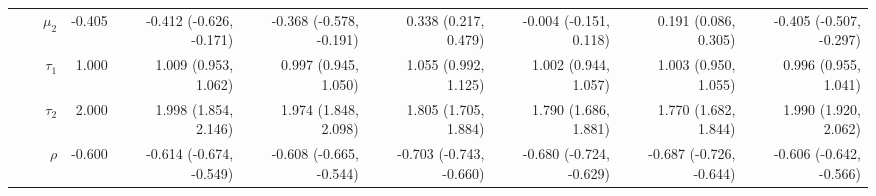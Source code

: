 \documentclass[
]{article}
\begin{document}
\begin{table}
\begin{tabular}[t]{rrrrrrrrrr}
 &  & $\mu_2$ & -0.405 & -0.412 (-0.626, -0.171) & -0.368 (-0.578, -0.191) & 0.338 (0.217, 0.479) & -0.004 (-0.151, 0.118) & 0.191 (0.086, 0.305) & -0.405 (-0.507, -0.297)\\
 &  & $\tau_1$ & 1.000 & 1.009 (0.953, 1.062) & 0.997 (0.945, 1.050) & 1.055 (0.992, 1.125) & 1.002 (0.944, 1.057) & 1.003 (0.950, 1.055) & 0.996 (0.955, 1.041)\\
 &  & $\tau_2$ & 2.000 & 1.998 (1.854, 2.146) & 1.974 (1.848, 2.098) & 1.805 (1.705, 1.884) & 1.790 (1.686, 1.881) & 1.770 (1.682, 1.844) & 1.990 (1.920, 2.062)\\
 &  & $\rho$ & -0.600 & -0.614 (-0.674, -0.549) & -0.608 (-0.665, -0.544) & -0.703 (-0.743, -0.660) & -0.680 (-0.724, -0.629) & -0.687 (-0.726, -0.644) & -0.606 (-0.642, -0.566)\\
\bottomrule
\end{tabular}
\end{table}
\end{document}
